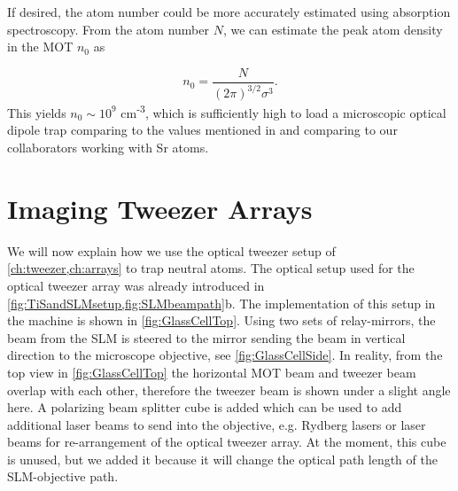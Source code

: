 If desired, the atom number could be more accurately estimated using absorption spectroscopy.
From the atom number $N$, we can estimate the peak atom density in the MOT $n_0$ as \cite{Townsend1995}

\begin{equation}
    n_0 = \frac{N}{(2\pi)^{3/2}\sigma^3}.
\end{equation}
This yields $n_0 \sim 10^9$ cm\textsuperscript{-3}, which is sufficiently high to load a microscopic optical dipole trap comparing to the values mentioned in \cite{Schlosser2002} and comparing to our collaborators working with Sr atoms.


\section{Imaging Tweezer Arrays}\label{sec:Tweezers}

We will now explain how we use the optical tweezer setup of \cref{ch:tweezer,ch:arrays} to trap neutral atoms. 
The optical setup used for the optical tweezer array was already introduced in \cref{fig:TiSandSLMsetup,fig:SLMbeampath}b.
The implementation of this setup in the machine is shown in \cref{fig:GlassCellTop}.
Using two sets of relay-mirrors, the beam from the \ac{SLM} is steered to the mirror sending the beam in vertical direction to the microscope objective, see \cref{fig:GlassCellSide}. 
In reality, from the top view in \cref{fig:GlassCellTop} the horizontal MOT beam and tweezer beam overlap with each other, therefore the tweezer beam is shown under a slight angle here.
A polarizing beam splitter cube is added which can be used to add additional laser beams to send into the objective, e.g. Rydberg lasers or laser beams for re-arrangement of the optical tweezer array. 
At the moment, this cube is unused, but we added it because it will change the optical path length of the SLM-objective path.

